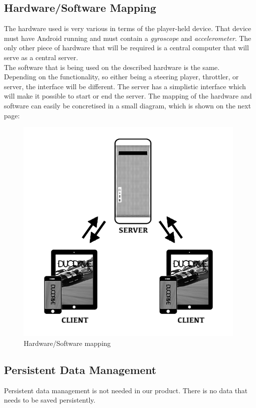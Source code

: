 \documentclass[11pt,twoside,a4paper]{article}
\begin{document}
\subsection{Hardware/Software Mapping}
The hardware used is very various in terms of the player-held device. That device must have Android running and must contain a \emph{gyroscope} and \emph{accelerometer}. The only other piece of hardware that will be required is a central computer that will serve as a central server. \\
The software that is being used on the described hardware is the same. Depending on the functionality, so either being a steering player, throttler, or server, the interface will be different. The server has a simplistic interface which will make it possible to start or end the server.
The mapping of the hardware and software can easily be concretised in a small diagram, which is shown on the next page:
\begin{figure}
	\includegraphics[width=\textwidth]{ClientServer.png}
	\caption{Hardware/Software mapping}
\end{figure}



\subsection{Persistent Data Management}
Persistent data management is not needed in our product. There is no data that needs to be saved persistently.
\end{document}

